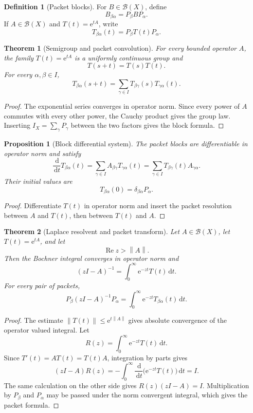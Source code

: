 \documentclass{aomart}
\newtheorem{theorem}{Theorem}[section]
\newtheorem{proposition}[proposition]{Proposition}
\theoremstyle{definition}
\newtheorem{definition}[definition]{Definition}
\theoremstyle{remark}
\newcommand{\e}{\mathrm e}
\newcommand{\dd}{\,\mathrm d}
\newcommand{\norm}[1]{\left\lVert#1\right\rVert}
\begin{document}
\begin{definition}[Packet blocks]
For \(B\in\mathcal B(X)\), define
\[
B_{\beta\alpha}=P_\beta BP_\alpha.
\]
If \(A\in\mathcal B(X)\) and \(T(t)=\e^{tA}\), write
\[
T_{\beta\alpha}(t)=P_\beta T(t)P_\alpha.
\]
\end{definition}

\begin{theorem}[Semigroup and packet convolution]\label{thm:packet_convolution}
For every bounded operator \(A\), the family \(T(t)=\e^{tA}\) is a uniformly continuous group and
\[
T(s+t)=T(s)T(t).
\]
For every \(\alpha,\beta\in I\),
\[
T_{\beta\alpha}(s+t)
=
\sum_{\gamma\in I}
T_{\beta\gamma}(s)T_{\gamma\alpha}(t).
\]
\end{theorem}

\begin{proof}
The exponential series converges in operator norm. Since every power of \(A\) commutes with every other power, the Cauchy product gives the group law. Inserting \(I_X=\sum_\gamma P_\gamma\) between the two factors gives the block formula.
\end{proof}

\begin{proposition}[Block differential system]\label{prop:block_differential}
The packet blocks are differentiable in operator norm and satisfy
\[
\frac{\dd}{\dd t}T_{\beta\alpha}(t)
=
\sum_{\gamma\in I}
A_{\beta\gamma}T_{\gamma\alpha}(t)
=
\sum_{\gamma\in I}
T_{\beta\gamma}(t)A_{\gamma\alpha}.
\]
Their initial values are
\[
T_{\beta\alpha}(0)=\delta_{\beta\alpha}P_\alpha.
\]
\end{proposition}

\begin{proof}
Differentiate \(T(t)\) in operator norm and insert the packet resolution between \(A\) and \(T(t)\), then between \(T(t)\) and \(A\).
\end{proof}

\begin{theorem}[Laplace resolvent and packet transform]\label{thm:laplace_packet_resolvent}
Let \(A\in\mathcal B(X)\), let \(T(t)=\e^{tA}\), and let
\[
\operatorname{Re}z>\norm A.
\]
Then the Bochner integral converges in operator norm and
\[
(zI-A)^{-1}
=
\int_0^\infty \e^{-zt}T(t)\dd t.
\]
For every pair of packets,
\[
P_\beta(zI-A)^{-1}P_\alpha
=
\int_0^\infty
\e^{-zt}T_{\beta\alpha}(t)\dd t.
\]
\end{theorem}

\begin{proof}
The estimate \(\norm{T(t)}\leq\e^{t\norm A}\) gives absolute convergence of the operator valued integral. Let
\[
R(z)=\int_0^\infty\e^{-zt}T(t)\dd t.
\]
Since \(T'(t)=AT(t)=T(t)A\), integration by parts gives
\[
(zI-A)R(z)
=
-\int_0^\infty
\frac{\dd}{\dd t}
\bigl(\e^{-zt}T(t)\bigr)
\dd t
=I.
\]
The same calculation on the other side gives
\(
R(z)(zI-A)=I
\).
Multiplication by \(P_\beta\) and \(P_\alpha\) may be passed under the norm convergent integral, which gives the packet formula.
\end{proof}
\end{document}
